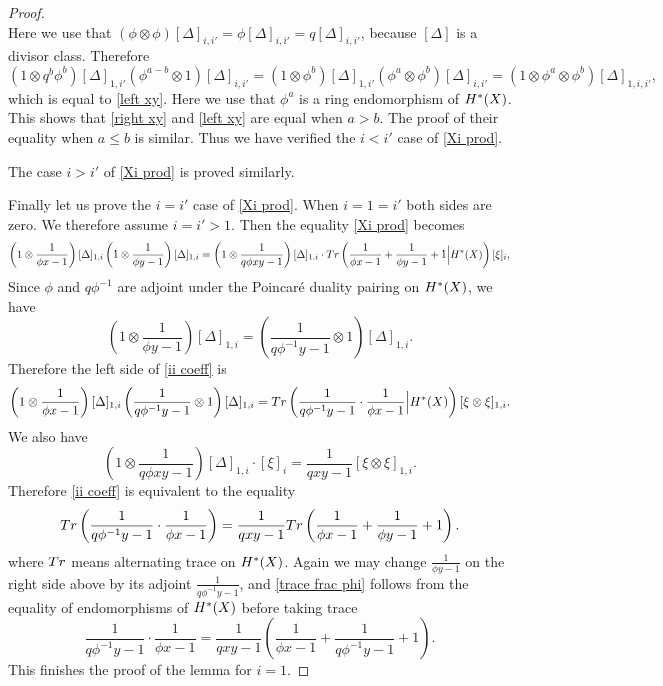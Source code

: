 \documentclass[10pt,a4paper]{amsart}
\newcommand\D\Delta
\newcommand\ot{\otimes}
\newcommand{\Tr}{\textup{Tr}}
\newcommand{\cohog}[2]{\textup{H}^{#1}({#2})}     %
\begin{document}
\begin{proof}
\begin{equation*}
    \end{equation*}
    Here we use that $(\phi\ot\phi)[\D]_{i,i'}=\phi[\D]_{i,i'}=q[\D]_{i,i'}$, because $[\D]$ is a divisor class. Therefore
    \begin{equation*}
        (1\ot q^b\phi^b)[\D]_{1,i'}(\phi^{a-b}\ot1)[\D]_{i,i'}=(1\ot \phi^b)[\D]_{1,i'}(\phi^a\ot \phi^{b})[\D]_{i,i'}=(1\ot \phi^a\ot \phi^b)[\D]_{1,i,i'},
    \end{equation*}
    which is equal to \eqref{left xy}.
    Here we use that $\phi^a$ is a ring endomorphism of $\cohog{*}{X}$. This shows that \eqref{right xy} and \eqref{left xy} are equal when $a>b$. The proof of their equality when $a\le b$ is similar. Thus we have verified the $i<i'$ case of \eqref{Xi prod}.

    The case $i>i'$ of \eqref{Xi prod} is proved similarly. 

    Finally let us prove the $i=i'$ case of \eqref{Xi prod}. When $i=1=i'$ both sides are zero. We therefore assume $i=i'>1$. Then the equality \eqref{Xi prod} becomes
    \begin{equation}\label{ii coeff}
        \left(1\ot \frac{1}{\phi x-1}\right)[\D]_{1,i}\left(1\ot \frac{1}{\phi y-1}\right)[\D]_{1,i}=\left(1\ot \frac{1}{q\phi xy-1}\right)[\D]_{1,i}\cdot \Tr\left(\frac{1}{\phi x-1}+\frac{1}{\phi y-1}+1\Big|\cohog{*}{X}\right)[\xi]_i,
    \end{equation}
    Since $\phi$ and $q\phi^{-1}$ are adjoint under the Poincar\'e duality pairing on $\cohog{*}{X}$, we have
    \begin{equation*}
    \left(1\ot \frac{1}{\phi y-1}\right)[\D]_{1,i}=\left(\frac{1}{q\phi^{-1}y-1}\ot 1\right)[\D]_{1,i}.
    \end{equation*}
    Therefore the left side of \eqref{ii coeff} is
    \begin{equation*}
    \left(1\ot \frac{1}{\phi x-1}\right)[\D]_{1,i}\left(\frac{1}{q\phi^{-1}y-1}\ot 1\right)[\D]_{1,i}=\Tr\left(\frac{1}{q\phi^{-1}y-1}\cdot\frac{1}{\phi x-1}\Big|\cohog{*}{X}\right)[\xi\ot\xi]_{1,i}.
    \end{equation*}
    We also have
    \begin{equation*}
    \left(1\ot \frac{1}{q\phi xy-1}\right)[\D]_{1,i}\cdot [\xi]_i=\frac{1}{qxy-1}[\xi\ot\xi]_{1,i}.
    \end{equation*}
    Therefore \eqref{ii coeff} is equivalent to the equality
    \begin{equation}\label{trace frac phi}
    \Tr\left(\frac{1}{q\phi^{-1}y-1}\cdot\frac{1}{\phi x-1}\right)=\frac{1}{qxy-1}\Tr\left(\frac{1}{\phi x-1}+\frac{1}{\phi y-1}+1\right).
    \end{equation}
    where $\Tr$ means alternating trace on $\cohog{*}{X}$. Again we may change $\frac{1}{\phi y-1}$ on the right side above by its adjoint $\frac{1}{q\phi^{-1}y-1}$, and \eqref{trace frac phi} follows from the equality of endomorphisms of $\cohog{*}{X}$ before taking trace
    \begin{equation*}
    \frac{1}{q\phi^{-1}y-1}\cdot\frac{1}{\phi x-1}=\frac{1}{qxy-1}\left(\frac{1}{\phi x-1}+\frac{1}{q\phi^{-1} y-1}+1\right).
    \end{equation*}
    This finishes the proof of the lemma for $i=1$.


\end{proof}
\end{document}
